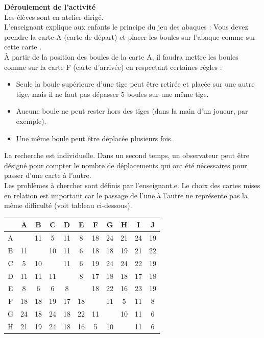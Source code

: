 \begin{exercice*}
{\bf Déroulement de l'activité} \\
Les élèves sont en atelier dirigé. \\
L'enseignant explique aux enfants le principe du jeu des abaques : \og Vous devez prendre la carte A (carte de départ) et placer les boules sur l'abaque comme sur cette carte \fg. \\
À partir de la position des boules de la carte A, il faudra mettre les boules comme sur la carte F (carte d’arrivée) en respectant certaines règles :
\begin{itemize}
   \item Seule la boule supérieure d'une tige peut être retirée et placée sur une autre tige, mais il ne faut pas dépasser 5 boules sur une même tige.
   \item Aucune boule ne peut rester hors des tiges (dans la main d'un joueur, par exemple).
   \item Une même boule peut être déplacée plusieurs fois.
\end{itemize}
La recherche est individuelle. Dans un second temps, un observateur peut être désigné pour compter le nombre de déplacements qui ont été nécessaires pour passer d'une carte à l'autre. \\
Les \og problèmes \fg{} à chercher sont définis par l’enseignant.e. Le choix des cartes mises en relation est important car le passage de l’une à l’autre ne représente pas la même difficulté (voit tableau ci-dessous). \\ [5mm]
\begin{minipage}{10cm}
   \begin{tabular}{|*{11}{c|}}
      \hline
      & A & B & C & D & E & F & G & H & I & J \\
      \hline
      A & & 11 & 5 & 11 & 8 & 18 & 24 & 21 & 24 & 19 \\
      \hline
      B & 11 & & 10 & 11 & 6 & 18 & 18 & 19 & 21 & 22 \\
      \hline
      C & 5 & 10 & & 11 & 6 & 19 & 24 & 24 & 22 & 19 \\
      \hline
      D & 11 & 11 & 11 & & 8 & 17 & 18 & 18 & 17 & 18 \\
      \hline
      E & 8 & 6 & 6 & 8 & & 18 & 22 & 16 & 23 & 19 \\
      \hline
      F & 18 & 18 & 19 & 17 & 18 & & 11 & 5 & 11 & 8 \\
      \hline
      G & 24 & 18 & 24 & 18 & 22 & 11 & & 10 & 11 & 6 \\
      \hline
      H & 21 & 19 & 24 & 18 & 16 & 5 & 10 & & 11 & 6 \\

\end{tabular}
\end{minipage}
\end{exercice*}
